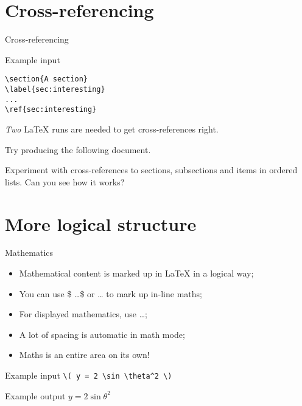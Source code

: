 \section{Cross-referencing}

\begin{frame}[fragile]{Cross-referencing}

  \begin{block}{Example input}
    \begin{verbatim}
\section{A section}
\label{sec:interesting}
...
\ref{sec:interesting}
    \end{verbatim}
  \end{block}
  
  \emph{Two} \LaTeX{} runs are needed to get cross-references right.

\end{frame}


\begin{exercise}
  Try producing the following document.
  
  
  Experiment with cross-references to sections, subsections and items in
  ordered lists. Can you see how it works?
\end{exercise}


\section{More logical structure}

\begin{frame}[fragile]{Mathematics}

  \begin{itemize}
    \item Mathematical content is marked up in \LaTeX{} in a logical way;
    \item You can use \$ \ldots \$ or \cs{(} \ldots \cs{)} to mark up
      in-line maths;
    \item For displayed mathematics, use \cs{[} \ldots \cs{]};
    \item A lot of spacing is automatic in math mode;
    \item Maths is an entire area on its own!
  \end{itemize}
  
  \begin{block}{Example input}
    \verb"\( y = 2 \sin \theta^2 \)" 
  \end{block}
  
  \begin{block}{Example output}
    \( y = 2 \sin \theta^2 \)
  \end{block}

\end{frame}


